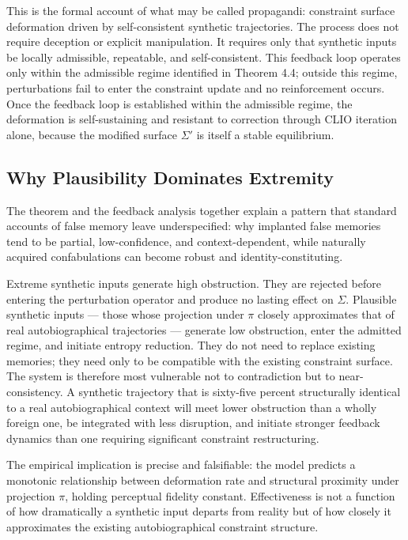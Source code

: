 \documentclass[12pt, a4paper]{article}
\begin{document}
This is the formal account of what may be called propagandi: constraint surface deformation driven by self-consistent synthetic trajectories. The process does not require deception or explicit manipulation. It requires only that synthetic inputs be locally admissible, repeatable, and self-consistent. This feedback loop operates only within the admissible regime identified in Theorem 4.4; outside this regime, perturbations fail to enter the constraint update and no reinforcement occurs. Once the feedback loop is established within the admissible regime, the deformation is self-sustaining and resistant to correction through CLIO iteration alone, because the modified surface $\Sigma'$ is itself a stable equilibrium.

\subsection{Why Plausibility Dominates Extremity}

The theorem and the feedback analysis together explain a pattern that standard accounts of false memory leave underspecified: why implanted false memories tend to be partial, low-confidence, and context-dependent, while naturally acquired confabulations can become robust and identity-constituting.

Extreme synthetic inputs generate high obstruction. They are rejected before entering the perturbation operator and produce no lasting effect on $\Sigma$. Plausible synthetic inputs --- those whose projection under $\pi$ closely approximates that of real autobiographical trajectories --- generate low obstruction, enter the admitted regime, and initiate entropy reduction. They do not need to replace existing memories; they need only to be compatible with the existing constraint surface. The system is therefore most vulnerable not to contradiction but to near-consistency. A synthetic trajectory that is sixty-five percent structurally identical to a real autobiographical context will meet lower obstruction than a wholly foreign one, be integrated with less disruption, and initiate stronger feedback dynamics than one requiring significant constraint restructuring.

The empirical implication is precise and falsifiable: the model predicts a monotonic relationship between deformation rate and structural proximity under projection $\pi$, holding perceptual fidelity constant. Effectiveness is not a function of how dramatically a synthetic input departs from reality but of how closely it approximates the existing autobiographical constraint structure.
\end{document}
